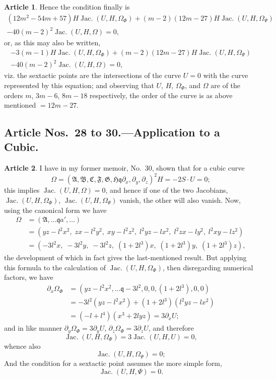 \documentclass[11pt,a4paper]{article}
\theoremstyle{definition}
\newtheorem{art}{Article}[section]
\DeclareMathOperator{\Jac}{Jac.}
\newcommand{\fA}{\mathfrak{A}}
\newcommand{\fB}{\mathfrak{B}}
\newcommand{\fC}{\mathfrak{C}}
\newcommand{\fF}{\mathfrak{F}}
\newcommand{\fG}{\mathfrak{G}}
\newcommand{\fH}{\mathfrak{H}}
\begin{document}
\begin{art}
Hence the condition finally is
\begin{multline*}
(12m^2 - 54m + 57)H\Jac(U, H, \Omega_\Phi)
+ (m-2)(12m - 27)H\Jac(U, H, \Omega_\Psi) \\
- 40(m-2)^2 \Jac(U, H, \Omega) = 0,
\end{multline*}
or, as this may also be written,
\begin{multline*}
-3(m-1)H\Jac(U, H, \Omega_\Phi) + (m-2)(12m-27)H\Jac(U, H, \Omega_\Psi) \\
- 40(m-2)^2 \Jac(U, H, \Omega) = 0,
\end{multline*}
viz. the sextactic points are the intersections of the curve $U=0$ with the curve
represented by this equation; and observing that $U$, $H$, $\Omega_\Phi$, and $\Omega$
are of the orders $m$, $3m-6$, $8m-18$ respectively, the order of the curve is as
above mentioned $= 12m - 27$.
\end{art}

\subsection*{Article Nos.\ 28 to 30.---Application to a Cubic.}

\setcounter{art}{27}
\begin{art}
I have in my former memoir, No.\ 30, shown that for a cubic curve
\[
\Omega = (\fA, \fB, \fC, \fF, \fG, \fH \mathbin{\mathfrak{q}} \partial_x, \partial_y, \partial_z)^2 H = -2S \cdot U = 0;
\]
this implies $\Jac(U, H, \Omega) = 0$, and hence if one of the two Jacobians,
$\Jac(U, H, \Omega_\Phi)$, $\Jac(U, H, \Omega_\Psi)$ vanish, the other will also vanish.
Now, using the canonical form we have
\begin{align*}
\Omega &= (\fA, \dots \mathbin{\mathfrak{q}} a', \dots) \\
&= (yz - l^2x^2,\; zx - l^2y^2,\; xy - l^2z^2,\; l^2yz - lx^2,\; l^2zx - ly^2,\; l^2xy - lz^2) \\
&= (-3l^2x,\; -3l^2y,\; -3l^2z,\; (1 + 2l^3)x,\; (1 + 2l^3)y,\; (1 + 2l^3)z),
\end{align*}
the development of which in fact gives the last-mentioned result. But applying this
formula to the calculation of $\Jac(U, H, \Omega_\Phi)$, then disregarding numerical factors,
we have
\begin{align*}
\partial_x \Omega_\Phi &= (yz - l^2x^2, \dots \mathbin{\mathfrak{q}} -3l^2, 0, 0, (1+2l^3), 0, 0) \\
&= -3l^2(yz - l^2x^2) + (1+2l^3)(l^2yz - lx^2) \\
&= (-l + l^4)(x^3 + 2lyz) = 3\partial_x U;
\end{align*}
and in like manner $\partial_y \Omega_\Phi = 3\partial_y U$, $\partial_z \Omega_\Phi = 3\partial_z U$, and therefore
\[
\Jac(U, H, \Omega_\Phi) = 3\Jac(U, H, U) = 0,
\]
whence also
\[
\Jac(U, H, \Omega_\Psi) = 0;
\]
And the condition for a sextactic point assumes the more simple form,
\[
\Jac(U, H, \Psi) = 0.
\]
\end{art}
\end{document}
